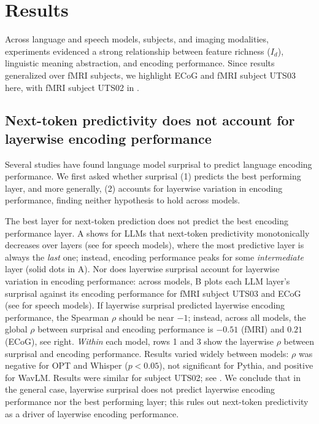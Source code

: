 \documentclass{article}
\theoremstyle{plain}
\theoremstyle{definition}
\theoremstyle{remark}
\begin{document}
\section{Results}
Across language and speech models, subjects, and imaging modalities, experiments evidenced a strong relationship between feature richness ($I_d$), linguistic meaning abstraction, and encoding performance. Since results generalized over fMRI subjects, we highlight ECoG and fMRI subject UTS03 here, with fMRI subject UTS02 in .

\subsection{Next-token predictivity does not account for layerwise encoding performance} 
Several studies \citep{schrimpf2021neural,Caucheteux2020.07.03.186288} have found language model surprisal to predict language encoding performance. We first asked whether surprisal (1) predicts the best performing layer, and more generally, (2) accounts for layerwise variation in encoding performance, finding neither hypothesis to hold across models.

The best layer for next-token prediction does not predict the best encoding performance layer. A shows for LLMs that next-token predictivity monotonically decreases over layers (see  for speech models), where the most predictive layer is always the \emph{last} one; instead, encoding performance peaks for some \emph{intermediate} layer (solid dots in A). Nor does layerwise surprisal account for layerwise variation in encoding performance: across models, B plots each LLM layer's surprisal against its encoding performance for fMRI subject UTS03 and ECoG (see  for speech models). If layerwise surprisal predicted layerwise encoding performance, the Spearman $\rho$ should be near $-1$; instead, across all models, the global $\rho$ between surprisal and encoding performance is $-0.51$ (fMRI) and $0.21$ (ECoG), see  right. \emph{Within} each model,  rows 1 and 3 show the layerwise $\rho$ between surprisal and encoding performance. Results varied widely between models: $\rho$ was negative for OPT and Whisper ($p<0.05$), not significant for Pythia, and positive for WavLM. Results were similar for subject UTS02; see . We conclude that in the general case, layerwise surprisal does not predict layerwise encoding performance nor the best performing layer; this rules out next-token predictivity as a driver of layerwise encoding performance.
\end{document}
